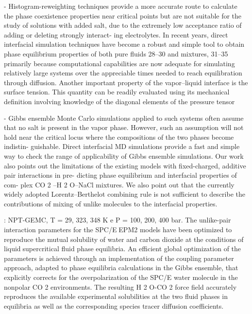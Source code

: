 - Histogram-reweighting techniques provide a more accurate route to calculate the phase coexistence properties near critical points but are not suitable for the study of solutions with added salt, due to the extremely
low acceptance ratio of adding or deleting strongly interact-
ing electrolytes. In recent years, direct interfacial simulation techniques have become a robust and simple tool to obtain phase equilibrium properties
of both pure fluids 28–30 and mixtures, 31–35 primarily because
computational capabilities are now adequate for simulating
relatively large systems over the appreciable times needed to
reach equilibration through diffusion. Another important property of the vapor–liquid interface is the surface tension. This quantity can be readily evaluated using its mechanical definition involving knowledge of the
diagonal elements of the pressure tensor

- Gibbs ensemble Monte Carlo simulations applied to such systems often
assume that no salt is present in the vapor phase. However,
such an assumption will not hold near the critical locus
where the compositions of the two phases become indistin-
guishable. Direct interfacial MD simulations provide a fast
and simple way to check the range of applicability of Gibbs
ensemble simulations. Our work also points out the limitations of the existing models with fixed-charged, additive pair interactions in pre-
dicting phase equilibrium and interfacial properties of com-
plex CO 2 –H 2 O–NaCl mixtures. We also point out that the
currently widely adopted Lorentz–Berthelot combining rule
is not sufficient to describe the contributions of mixing of
unlike molecules to the interfacial properties.



\cite{Vlcek2011}: NPT-GEMC, T = 29, 323, 348 K e P = 100, 200, 400 bar. The unlike-pair interaction parameters for the SPC/EEPM2 models have been optimized to reproduce the mutual solubility of
water and carbon dioxide at the conditions of liquidsupercritical ﬂuid phase equilibria. An eﬃcient global optimization of the
parameters is achieved through an implementation of the coupling parameter approach, adapted to phase equilibria calculations in
the Gibbs ensemble, that explicitly corrects for the overpolarization of the SPC/E water molecule in the nonpolar CO 2
environments. The resulting H 2 O-CO 2 force ﬁeld accurately reproduces the available experimental solubilities at the two ﬂuid
phases in equilibria as well as the corresponding species tracer diﬀusion coeﬃcients.

